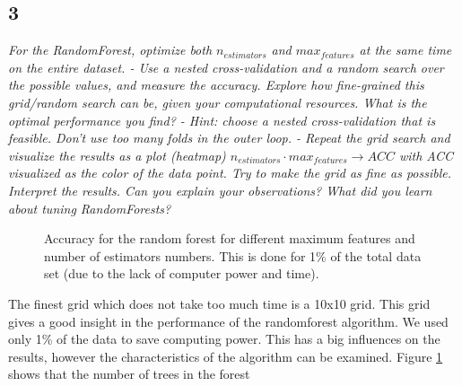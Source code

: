 \documentclass[a4paper,12pt]{article}
\begin{document}
{\subsection*{3}
{\it For the RandomForest, optimize both $n_{estimators}$ and $max_{features}$ at the same time on the entire dataset. - Use a nested cross-validation and a random search over the possible values, and measure the accuracy. Explore how fine-grained this grid/random search can be, given your computational resources. What is the optimal performance you find? - Hint: choose a nested cross-validation that is feasible. Don’t use too many folds in the outer loop. - Repeat the grid search and visualize the results as a plot (heatmap) $n_{estimators}\cdot max_{features} \rightarrow ACC$ with ACC visualized as the color of the data point. Try to make the grid as fine as possible. Interpret the results. Can you explain your observations? What did you learn about tuning RandomForests?}
\begin{figure}[H]
\hfill
{}
\hfill
\caption{Accuracy for the random forest for different maximum features and number of estimators numbers. This is done for 1\% of the total data set (due to the lack of computer power and time).}
\label{Q23}
\end{figure}
\textnormal{The finest grid which does not take too much time is a 10x10 grid. This grid gives a good insight in the performance of the randomforest algorithm. We used only 1\% of the data to save computing power. This has a big influences on the results, however the characteristics of the algorithm can be examined. Figure \ref{Q23} shows that the number of trees in the forest  } 

}
\end{document}
